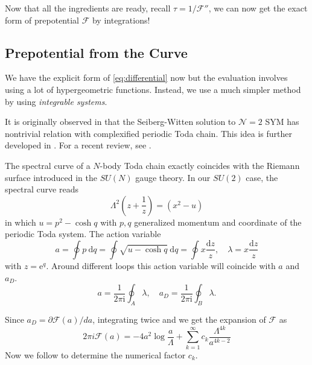 \documentclass{article}
\begin{document}
Now that all the ingredients are ready, recall $\tau=1/\mathscr{F}''$, we can now get the exact form of prepotential $\mathscr{F}$ by integrations!

\subsection{Prepotential from the Curve}
We have the explicit form of \eqref{eq:differential} now but the evaluation involves using a lot of hypergeometric functions. Instead, we use a much simpler method by using \textit{integrable systems}.

It is originally observed in \cite{Gorsky:1995zq} that the Seiberg-Witten solution to $\mathcal{N}=2$ SYM has nontrivial relation with complexified periodic Toda chain. This idea is further developed in \cite{Martinec:1995by,Witten:1997sc}. For a recent review, see \cite{Gorsky:2018ivr}. 

The spectral curve of a $N$-body Toda chain exactly coincides with the Riemann surface introduced in the $SU(N)$ gauge theory. In our $SU(2)$ case, the spectral curve reads 
\begin{equation}
    \Lambda^2(z+\frac{1}{z})=(x^2-u)
\end{equation}
in which $u=p^2-\operatorname{cosh}q$ with $p,q$ generalized momentum and coordinate of the periodic Toda system. The action variable
\begin{equation}
a=\oint p \mathrm{~d} q=\oint \sqrt{u-\cosh q} \mathrm{~d} q=\oint x \frac{\mathrm{d} z}{z}, \quad \lambda=x \frac{\mathrm{d} z}{z}
\end{equation}
with $z=\mathrm{e}^q$. Around different loops this action variable will coincide with $a$ and $a_D$.
\begin{equation}
    a=\frac{1}{2\pi\mathrm{i}}\oint_A\lambda,\quad a_D=\frac{1}{2\pi\mathrm{i}}\oint_B\lambda.
\end{equation}

Since $a_D=\partial\mathscr{F}(a)/da$, integrating twice and we get the expansion of $\mathscr{F}$ as
\begin{equation}
\label{eq:prep2}
2 \pi i \mathscr{F}(a)=-4 a^{2} \log \frac{a}{\Lambda}+\sum_{k=1}^{\infty} c_{k} \frac{\Lambda^{4 k}}{a^{4 k-2}}
\end{equation}
Now we follow \cite{Chan:1999gj,Tac15} to determine the numerical factor $c_k$.
\end{document}
